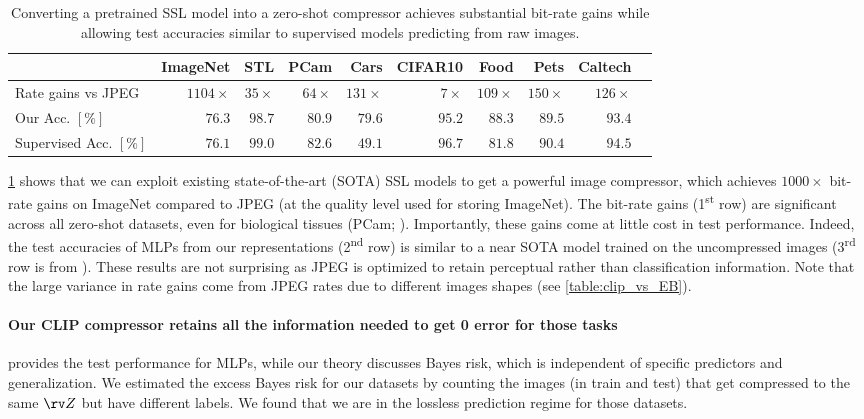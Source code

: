 \documentclass[final]{article}
\begin{document}
\begin{table}[h]
\vspace{-1\baselineskip}
\caption{
Converting a pretrained SSL model into a zero-shot compressor achieves substantial bit-rate gains while allowing test accuracies similar to supervised models predicting from raw images. 
}
\small
\center
\begin{tabular}{lrrrrrrrrr}
\toprule
& ImageNet  & STL & PCam & Cars & CIFAR10 & Food       & Pets & Caltech  \\ \midrule 
Rate gains vs JPEG &  $1104\times$  & $35\times$ &  $64\times$  &  $131\times$ & $7\times$ & $109\times$ & $150\times$ & $126\times$  \\ \midrule 
Our Acc. $[\%]$ &  $76.3$  &  $98.7$ & $80.9$ &  $79.6$ & $95.2$ &  $88.3$ & $89.5$ & $93.4$  \\
Supervised Acc. $[\%]$ & $76.1$   &  $99.0$ &  $82.6$  & $49.1$ &  $96.7$ &  $81.8$ & $90.4$ & $94.5$ \\ 
\bottomrule
\end{tabular}
\label{table:clip}
\end{table} 
\cref{table:clip} shows that we can exploit existing state-of-the-art (SOTA) SSL models to get a powerful image compressor, which achieves $1000\times$ bit-rate gains on ImageNet compared to JPEG (at the quality level used for storing ImageNet).
The bit-rate gains (1\textsuperscript{st} row) are significant across all zero-shot datasets, even for biological tissues (PCam; \cite{veeling_rotation_2018}).
Importantly, these gains come at little cost in test performance.
Indeed, the test accuracies of MLPs from our representations (2\textsuperscript{nd} row) is similar to a near SOTA model trained on the uncompressed images (3\textsuperscript{rd} row is from \citet{radford_learning_2021}).
These results are not surprising as JPEG is optimized to retain perceptual rather than classification information.
Note that the large variance in rate gains come from JPEG rates due to different images shapes (see \cref{table:clip_vs_EB}).

\paragraph{Our CLIP compressor retains all the information needed to get 0 error for those tasks}
 provides the test performance for MLPs, while our theory discusses Bayes risk, which is independent of specific predictors and generalization. 
We estimated the excess Bayes risk for our datasets by counting the images (in train and test) that get compressed to the same $\rv Z$ but have different labels. 
We found that we are in the lossless prediction regime for those datasets.
\end{document}
